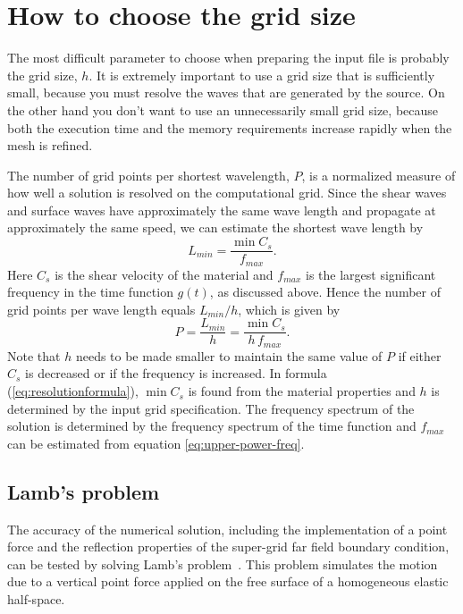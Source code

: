 \documentclass[11pt]{report}
\begin{document}
{\section{How to choose the grid size} \label{sec:grid-size}

The most difficult parameter to choose when preparing the input file is probably the grid size,
$h$. It is extremely important to use a grid size that is sufficiently small, because you must resolve
the waves that are generated by the source. On the other hand you don't want to use an
unnecessarily small grid size, because both the execution time and the memory requirements
increase rapidly when the mesh is refined.

The number of grid points per shortest wavelength, $P$, is a normalized measure of how well a
solution is resolved on the computational grid. Since the shear waves and surface waves have
approximately the same wave length and propagate at approximately the same speed, we can estimate
the shortest wave length by
\[
	L_{min} = \dfrac{\min C_s}{f_{max}}.
\]
Here $C_s$ is the shear velocity of the material and $f_{max}$ is the largest significant frequency
in the time function $g(t)$, as discussed above. Hence the number of grid points per wave length
equals $L_{min}/h$, which is given by
%
\begin{equation}\label{eq:resolutionformula}
	P = \frac{L_{min}}{h} = \dfrac{\min C_s}{h\,f_{max}}.
\end{equation}
Note that $h$ needs to be made smaller to maintain the same value of $P$ if either $C_s$ is
decreased or if the frequency is increased. In formula (\ref{eq:resolutionformula}), $\min C_s$ is
found from the material properties and $h$ is determined by the input grid specification.  The
frequency spectrum of the solution is determined by the frequency spectrum of the time
function and $f_{max}$ can be estimated from equation \eqref{eq:upper-power-freq}.

\subsection{Lamb's problem}
\label{sec:lamb}

The accuracy of the numerical solution, including the implementation of a point force and the
reflection properties of the super-grid far field boundary condition, can be tested by solving
Lamb's problem~\cite{Lamb_1904}. This problem simulates the motion due to a vertical point force
applied on the free surface of a homogeneous elastic half-space.

}
\end{document}
